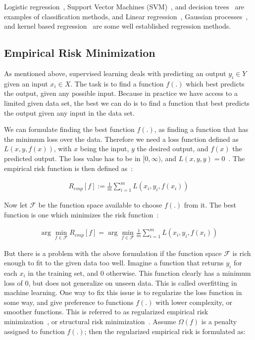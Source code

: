 Logistic regression~\cite{logistic-regression1,logistic-regression2}, Support Vector Machines (SVM)~\cite{svm1,svm2}, and decision trees~\cite[Ch. 9]{statistical-learning} are examples of classification methods, and Linear regression~\cite[Ch. 3]{statistical-learning}, Gaussian processes~\cite{gaussian-processes}, and kernel based regression~\cite[Ch. 9]{learning-with-kernels} are some well established regression methods.

\subsection{Empirical Risk Minimization}
\label{chap:empirical-risk-minimization}
As mentioned above, supervised learning deals with predicting an output $y_i \in Y$ given an input $x_i \in X$. The task is to find a function $f(.)$ which best predicts the output, given any possible input. Because in practice we have access to a limited given data set, the best we can do is to find a function that best predicts the output given any input in the data set.

We can formulate finding the best function $f(.)$, as finding a function that has the minimum loss over the data. Therefore we need a loss function defined as $L(x, y, f(x))$, with $x$ being the input, $y$ the desired output, and $f(x)$ the predicted output. The loss value has to be in $[0, \infty)$, and $L(x, y, y) = 0$~\cite[p. 62]{learning-with-kernels}. The empirical risk function is then defined as~\cite[p. 67]{learning-with-kernels}:

  \begin{align}
    R_{emp}[f] := \frac{1}{m}\sum_{i = 1}^{m} L(x_i, y_i, f(x_i))
  \end{align}
  
Now let $\mathcal{F}$ be the function space available to choose $f(.)$ from it. The best function is one which minimizes the risk function~\cite[p. 67]{learning-with-kernels}:

\begin{align}
  \arg \min_{f \in \mathcal{F}} R_{emp}[f] = \arg \min_{f \in \mathcal{F}} \frac{1}{m}\sum_{i = 1}^{m} L(x_i, y_i, f(x_i))
\end{align}

But there is a problem with the above formulation if the function space $\mathcal{F}$ is rich enough to fit to the given data too well. Imagine a function that returns $y_i$ for each $x_i$ in the training set, and $0$ otherwise. This function clearly has a minimum loss of $0$, but does not generalize on unseen data. This is called overfitting in machine learning. One way to fix this issue is to regularize the loss function in some way, and give preference to functions $f(.)$ with lower complexity, or smoother functions. This is referred to as regularized empirical risk minimization~\cite[Ch. 4.1]{learning-with-kernels}, or structural risk minimization~\cite[Ch. 4.1]{thenatureofstatisticallearningtheory}. Assume $\Omega(f)$ is a penalty assigned to function $f(.)$; then the regularized empirical risk is formulated as:


